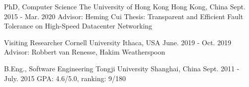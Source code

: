 

\begin{cventries}


\cventry
{PhD, Computer Science} %
{The University of Hong Kong} %
{Hong Kong, China} %
{Sept. 2015 - Mar. 2020} %
{ %
Advisor: Heming Cui\newline
Thesis: Transparent and Efficient Fault Tolerance on High-Speed Datacenter Networking
}


\cventry
{Visiting Researcher} %
{Cornell University} %
{Ithaca, USA} %
{June. 2019 - Oct. 2019} %
{ %
Advisor: Robbert van Renesse, Hakim Weatherspoon
}


\cventry
{B.Eng., Software Engineering} %
{Tongji University} %
{Shanghai, China} %
{Sept. 2011 - July. 2015} %
{ %
GPA: 4.6/5.0, ranking: 9/180
}

\end{cventries}

